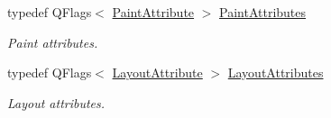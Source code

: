 \begin{DoxyCompactItemize}
typedef Q\-Flags$<$ \hyperlink{class_qwt_text_a9739e47ea489e690f121e4b1d27ae24e}{Paint\-Attribute} $>$ \hyperlink{class_qwt_text_a0d239ca5c8e0cd3c748325ad453bb13f}{Paint\-Attributes}
\begin{DoxyCompactList}\small\item\em Paint attributes. \end{DoxyCompactList}\item 
typedef Q\-Flags$<$ \hyperlink{class_qwt_text_a0953aabc098f410dba89bbada47f2e5a}{Layout\-Attribute} $>$ \hyperlink{class_qwt_text_aadd451b81d506c5bbefdddb8a100b9a3}{Layout\-Attributes}
\begin{DoxyCompactList}\small\item\em Layout attributes. \end{DoxyCompactList}\end{DoxyCompactItemize}
